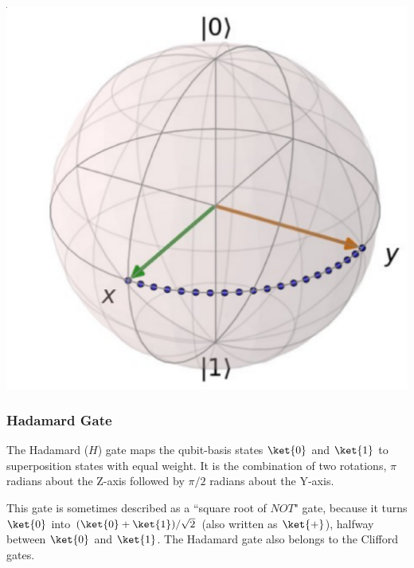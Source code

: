 \documentclass[11pt]{article}
\begin{document}
\begin{center}
\includegraphics[scale=0.30]{images/s_gate.eps}
\end{center}

\subsubsection{Hadamard Gate}
The Hadamard ($H$) gate maps the qubit-basis states $\ket{0}$ and $\ket{1}$ to superposition states with equal weight. It is the combination of two rotations, $\pi$ radians about the Z-axis followed by $\pi/2$ radians about the Y-axis.

This gate is sometimes described as a ``square root of $NOT$" gate, because it turns $\ket{0}$ into $(\ket{0} + \ket{1})/\sqrt2$ (also written as $\ket{+}$), halfway between $\ket{0}$ and $\ket{1}$. The Hadamard gate also belongs to the Clifford gates.
\end{document}
